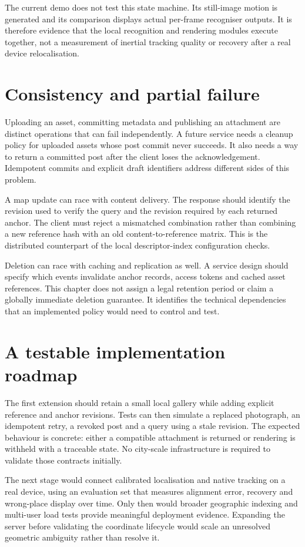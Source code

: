 The current demo does not test this state machine. Its still-image motion is generated and its comparison displays actual per-frame recogniser outputs. It is therefore evidence that the local recognition and rendering modules execute together, not a measurement of inertial tracking quality or recovery after a real device relocalisation.

\section{Consistency and partial failure}
Uploading an asset, committing metadata and publishing an attachment are distinct operations that can fail independently. A future service needs a cleanup policy for uploaded assets whose post commit never succeeds. It also needs a way to return a committed post after the client loses the acknowledgement. Idempotent commits and explicit draft identifiers address different sides of this problem.

A map update can race with content delivery. The response should identify the revision used to verify the query and the revision required by each returned anchor. The client must reject a mismatched combination rather than combining a new reference hash with an old content-to-reference matrix. This is the distributed counterpart of the local descriptor-index configuration checks.

Deletion can race with caching and replication as well. A service design should specify which events invalidate anchor records, access tokens and cached asset references. This chapter does not assign a legal retention period or claim a globally immediate deletion guarantee. It identifies the technical dependencies that an implemented policy would need to control and test.

\section{A testable implementation roadmap}
The first extension should retain a small local gallery while adding explicit reference and anchor revisions. Tests can then simulate a replaced photograph, an idempotent retry, a revoked post and a query using a stale revision. The expected behaviour is concrete: either a compatible attachment is returned or rendering is withheld with a traceable state. No city-scale infrastructure is required to validate those contracts initially.

The next stage would connect calibrated localisation and native tracking on a real device, using an evaluation set that measures alignment error, recovery and wrong-place display over time. Only then would broader geographic indexing and multi-user load tests provide meaningful deployment evidence. Expanding the server before validating the coordinate lifecycle would scale an unresolved geometric ambiguity rather than resolve it.
